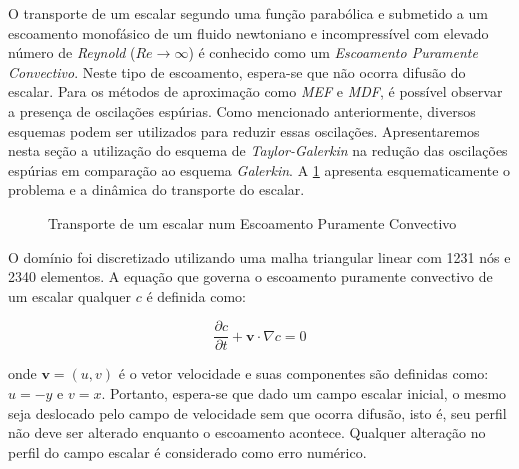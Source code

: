 O transporte de um escalar segundo uma função parabólica
e submetido a um escoamento monofásico de um fluido
newtoniano e incompressível com elevado número de \textit{Reynold} ($\textit{Re} \rightarrow \infty$)
é conhecido como um \textit{Escoamento Puramente Convectivo}.
Neste tipo de escoamento, espera-se que não ocorra difusão do escalar.
Para os métodos de aproximação como \textit{MEF} e \textit{MDF},
é possível observar a presença de oscilações espúrias. 
Como mencionado anteriormente, diversos esquemas podem ser utilizados para reduzir essas
oscilações. Apresentaremos nesta seção a utilização do esquema de
\textit{Taylor-Galerkin} na redução das oscilações espúrias em comparação ao esquema \textit{Galerkin}.
A \ref{conveccao} apresenta esquematicamente o problema e
a dinâmica do transporte do escalar.

\vspace{0.5cm}
\begin{figure}[H]
\begin{center}
\end{center}
\caption{Transporte de um escalar num Escoamento Puramente Convectivo}
\label{conveccao}
\end{figure}

\medskip
O domínio foi discretizado utilizando uma malha 
triangular linear com 1231 nós e 2340 elementos. 
A equação que governa o escoamento puramente convectivo
de um escalar qualquer $c$ é definida como:

\begin{equation}
 \frac{\partial c}{\partial t} 
 + 
 \textbf{v} \cdot \nabla c
 = 0
\end{equation}

\noindent
onde $\textbf{v} = (u,v)$ é o vetor velocidade e suas componentes 
são definidas como: $u = -y$ e $v = x$. Portanto, espera-se que
dado um campo escalar inicial, o mesmo seja deslocado pelo campo
de velocidade sem que ocorra difusão, isto é, seu perfil não deve
ser alterado enquanto o escoamento acontece. Qualquer alteração
no perfil do campo escalar é considerado como erro numérico.


